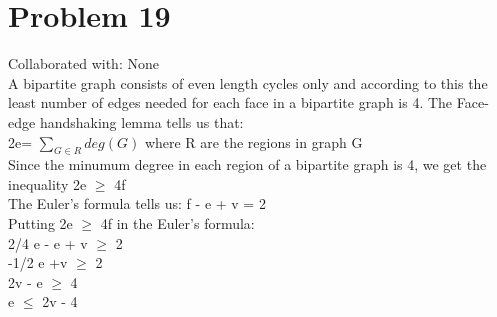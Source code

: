 \documentclass{article}
\begin{document}
\section{Problem 19}
Collaborated with: None\\
A bipartite graph consists of even length cycles only and according to this the least number of edges needed for each face in a bipartite graph is 4. The Face-edge handshaking lemma tells us that: \\
2e= $\sum_{G \in R} deg(G)$ where R are the regions in graph G\\
Since the minumum degree in each region of a bipartite graph is 4, we get the inequality 2e $\geq$ 4f\\ 
The Euler's formula tells us: f - e + v = 2\\
Putting 2e $\geq$ 4f in the Euler's formula: \\
2/4 e - e + v $\geq$ 2 \\
-1/2 e +v $\geq$ 2 \\
2v - e $\geq$ 4\\
e $\leq$ 2v - 4
\end{document}
